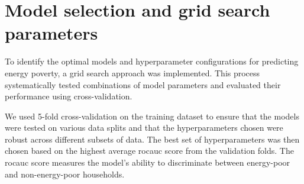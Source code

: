 \documentclass[preprint,authoryear,12pt]{elsarticle}
\begin{document}
\appendix
\glsresetall

\newpage


\FloatBarrier

\newpage
\section{Model selection and grid search parameters} \label{AppendixB}

To identify the optimal models and hyperparameter configurations for predicting energy poverty, a grid search approach was implemented. This process systematically tested combinations of model parameters and evaluated their performance using cross-validation.

We used 5-fold cross-validation on the training dataset to ensure that the models were tested on various data splits and that the hyperparameters chosen were robust across different subsets of data. The best set of hyperparameters was then chosen based on the highest average \Gls{rocauc} score from the validation folds. The \Gls{rocauc} score measures the model’s ability to discriminate between energy-poor and non-energy-poor households.
\end{document}
